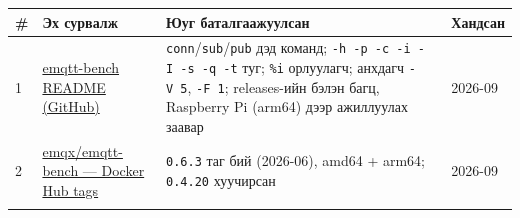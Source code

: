 \begingroup\scriptsize\begin{longtable}[]{@{}llll@{}}
\toprule
\begin{minipage}[b]{0.22\columnwidth}\raggedright
\#\strut
\end{minipage} & \begin{minipage}[b]{0.22\columnwidth}\raggedright
Эх сурвалж\strut
\end{minipage} & \begin{minipage}[b]{0.22\columnwidth}\raggedright
Юуг баталгаажуулсан\strut
\end{minipage} & \begin{minipage}[b]{0.22\columnwidth}\raggedright
Хандсан\strut
\end{minipage}\tabularnewline
\midrule
\endhead
\begin{minipage}[t]{0.22\columnwidth}\raggedright
1\strut
\end{minipage} & \begin{minipage}[t]{0.22\columnwidth}\raggedright
\href{https://github.com/emqx/emqtt-bench}{emqtt-bench README (GitHub)}\strut
\end{minipage} & \begin{minipage}[t]{0.22\columnwidth}\raggedright
\texttt{conn}/\allowbreak\texttt{sub}/\allowbreak\texttt{pub} дэд команд; \texttt{-h\ -p\ -c\ -i\ -I\ -s\ -q\ -t} туг; \texttt{\%i} орлуулагч; анхдагч \texttt{-V\ 5}, \texttt{-F\ 1}; releases-ийн бэлэн багц, Raspberry Pi (arm64) дээр ажиллуулах заавар\strut
\end{minipage} & \begin{minipage}[t]{0.22\columnwidth}\raggedright
2026-09\strut
\end{minipage}\tabularnewline
\begin{minipage}[t]{0.22\columnwidth}\raggedright
2\strut
\end{minipage} & \begin{minipage}[t]{0.22\columnwidth}\raggedright
\href{https://hub.docker.com/r/emqx/emqtt-bench/tags}{emqx/\allowbreak{}emqtt-bench --- Docker Hub tags}\strut
\end{minipage} & \begin{minipage}[t]{0.22\columnwidth}\raggedright
\texttt{0.6.3} таг бий (2026-06), amd64 + arm64; \texttt{0.4.20} хуучирсан\strut
\end{minipage} & \begin{minipage}[t]{0.22\columnwidth}\raggedright
2026-09\strut
\end{minipage}\tabularnewline
\begin{minipage}[t]{0.22\columnwidth}\raggedright

\end{minipage}
\end{longtable}
